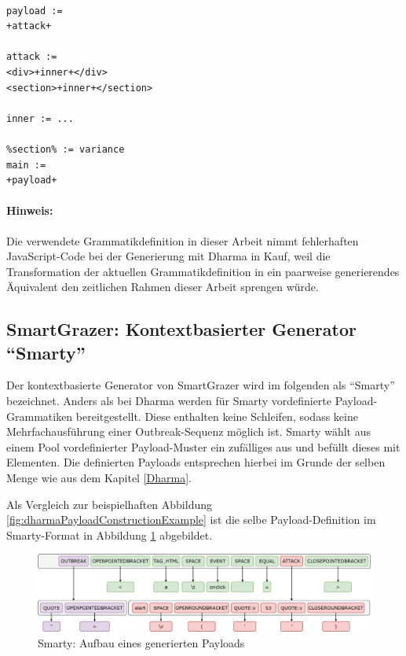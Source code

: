 \begin{lstlisting}[caption={Dharma: Beispiel einer paarweisen XSS-Grammatikdefinition},label=lst:dharmaPairwiseWorkaround]
%section% := value

payload :=
+attack+

attack :=
<div>+inner+</div>
<section>+inner+</section>

inner := ...

%section% := variance
main :=
+payload+
\end{lstlisting}

\paragraph{Hinweis:} Die verwendete Grammatikdefinition in dieser Arbeit nimmt fehlerhaften JavaScript-Code bei der Generierung mit Dharma in Kauf, weil die Transformation der aktuellen Grammatikdefinition in ein paarweise generierendes Äquivalent den zeitlichen Rahmen dieser Arbeit sprengen würde.

\subsection{SmartGrazer: Kontextbasierter Generator ``Smarty''}\label{Smarty}

Der kontextbasierte Generator von SmartGrazer wird im folgenden als ``Smarty'' bezeichnet. Anders als bei Dharma werden für Smarty vordefinierte Payload-Grammatiken bereitgestellt. Diese enthalten keine Schleifen, sodass keine Mehrfachausführung einer Outbreak-Sequenz möglich ist. Smarty wählt aus einem Pool vordefinierter Payload-Muster ein zufälliges aus und befüllt dieses mit Elementen. Die definierten Payloads entsprechen hierbei im Grunde der selben Menge wie aus dem Kapitel \ref{Dharma}.

Als Vergleich zur beispielhaften Abbildung \ref{fig:dharmaPayloadConstructionExample} ist die selbe Payload-Definition im Smarty-Format in Abbildung \ref{fig:smartyPayloadConstructionExample} abgebildet.

\begin{figure}[htbp] 
	\centering
	\includegraphics[width=\textwidth]{contents/images/SmartGrazerPayloadConstructionExample}
	\caption{Smarty: Aufbau eines generierten Payloads}
	\label{fig:smartyPayloadConstructionExample}
\end{figure}

